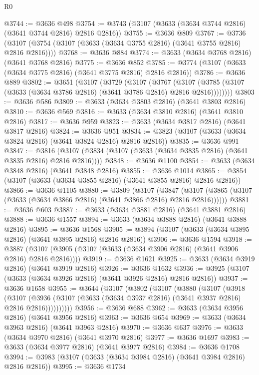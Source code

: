 \begin{lexlean}{R0}
\begin{coremodule}
@3744 := @3636 @498
@3754 := @3743 (@3107 (@3633 (@3634 @3744 @2816) (@3641 @3744 @2816) @2816 @2816))
@3755 := @3636 @809
@3767 := @3736 (@3107 (@3754 (@3107 (@3633 (@3634 @3755 @2816) (@3641 @3755 @2816) @2816 @2816))))
@3768 := @3636 @884
@3774 := @3633 (@3634 @3768 @2816) (@3641 @3768 @2816)
@3775 := @3636 @852
@3785 := @3774 (@3107 (@3633 (@3634 @3775 @2816) (@3641 @3775 @2816) @2816 @2816))
@3786 := @3636 @889
@3802 := @3651
    (@3107
      (@3729
        (@3107
          (@3767
            (@3107 (@3785 (@3107 (@3633 (@3634 @3786 @2816) (@3641 @3786 @2816) @2816 @2816))))))))
@3803 := @3636 @586
@3809 := @3633 (@3634 @3803 @2816) (@3641 @3803 @2816)
@3810 := @3636 @569
@3816 := @3633 (@3634 @3810 @2816) (@3641 @3810 @2816)
@3817 := @3636 @959
@3823 := @3633 (@3634 @3817 @2816) (@3641 @3817 @2816)
@3824 := @3636 @951
@3834 := @3823 (@3107 (@3633 (@3634 @3824 @2816) (@3641 @3824 @2816) @2816 @2816))
@3835 := @3636 @991
@3847 := @3816 (@3107 (@3834 (@3107 (@3633 (@3634 @3835 @2816) (@3641 @3835 @2816) @2816 @2816))))
@3848 := @3636 @1100
@3854 := @3633 (@3634 @3848 @2816) (@3641 @3848 @2816)
@3855 := @3636 @1014
@3865 := @3854 (@3107 (@3633 (@3634 @3855 @2816) (@3641 @3855 @2816) @2816 @2816))
@3866 := @3636 @1105
@3880 := @3809
    (@3107
      (@3847 (@3107 (@3865 (@3107 (@3633 (@3634 @3866 @2816) (@3641 @3866 @2816) @2816 @2816))))))
@3881 := @3636 @603
@3887 := @3633 (@3634 @3881 @2816) (@3641 @3881 @2816)
@3888 := @3636 @1557
@3894 := @3633 (@3634 @3888 @2816) (@3641 @3888 @2816)
@3895 := @3636 @1568
@3905 := @3894 (@3107 (@3633 (@3634 @3895 @2816) (@3641 @3895 @2816) @2816 @2816))
@3906 := @3636 @1594
@3918 := @3887 (@3107 (@3905 (@3107 (@3633 (@3634 @3906 @2816) (@3641 @3906 @2816) @2816 @2816))))
@3919 := @3636 @1621
@3925 := @3633 (@3634 @3919 @2816) (@3641 @3919 @2816)
@3926 := @3636 @1632
@3936 := @3925 (@3107 (@3633 (@3634 @3926 @2816) (@3641 @3926 @2816) @2816 @2816))
@3937 := @3636 @1658
@3955 := @3644
    (@3107
      (@3802
        (@3107
          (@3880
            (@3107
              (@3918
                (@3107
                  (@3936 (@3107 (@3633 (@3634 @3937 @2816) (@3641 @3937 @2816) @2816 @2816))))))))))
@3956 := @3636 @688
@3962 := @3633 (@3634 @3956 @2816) (@3641 @3956 @2816)
@3963 := @3636 @654
@3969 := @3633 (@3634 @3963 @2816) (@3641 @3963 @2816)
@3970 := @3636 @637
@3976 := @3633 (@3634 @3970 @2816) (@3641 @3970 @2816)
@3977 := @3636 @1697
@3983 := @3633 (@3634 @3977 @2816) (@3641 @3977 @2816)
@3984 := @3636 @1708
@3994 := @3983 (@3107 (@3633 (@3634 @3984 @2816) (@3641 @3984 @2816) @2816 @2816))
@3995 := @3636 @1734

\end{coremodule}
\end{lexlean}
